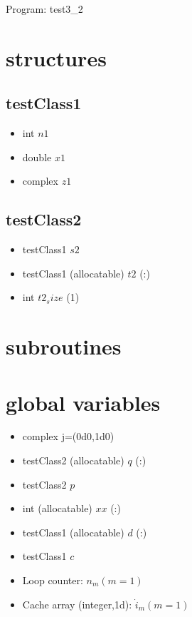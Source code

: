 \documentclass[a4paper,fleqn]{ltjsarticle}
\begin{document}
{\Large Program: test3\_2}

\section{structures}
\subsection{testClass1}\begin{itemize}
  \item int $n1$
  \item double $x1$
  \item complex $z1$
\end{itemize}
\subsection{testClass2}\begin{itemize}
  \item testClass1 $s2$
  \item testClass1 (allocatable) $t2$ (:)
  \item int $t2_size$ (1)
\end{itemize}
\section{subroutines}
\section{global variables}
\begin{itemize}
\item complex $\mathrm{j}$=(0d0,1d0)
\item testClass2 (allocatable) $q$ (:)
\item testClass2 $p$
\item int (allocatable) $xx$ (:)
\item testClass1 (allocatable) $d$ (:)
\item testClass1 $c$
\item Loop counter: \(n_m (m = 1)\)
\item Cache array (integer,1d): \(\dot{i}_m (m = 1)\)
\end{itemize}
\end{document}
